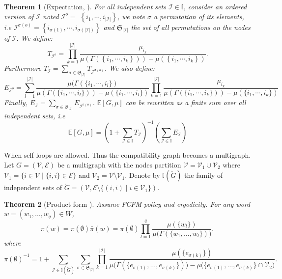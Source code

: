 \documentclass[11pt]{article}
\newtheorem{theorem}{Theorem}
\begin{document}
\begin{theorem}[Expectation, \cite{CDFB21}]\label{thm:EV-simple}
For all independent sets $\mathcal{I} \in \mathbb{I}$, consider an ordered version of $\mathcal{I}$ noted $\mathcal{I}^o=$ $\left\{i_1, \cdots, i_{|\mathcal{I}|}\right\}$, we note $\sigma$ a permutation of its elements, i.e $\mathcal{I}^{\sigma(o)}=\left\{i_{\sigma(1)}, \cdots, i_{\sigma(|\mathcal{I}|)}\right\}$ and $\mathfrak{S}_{|\mathcal{I}|}$ the set of all permutations on the nodes of $\mathcal{I}$. We define:
\[
T_{\mathcal{I}^o}=\prod_{k=1}^{|\mathcal{I}|} 
\frac{\mu_{i_k}}
{ \mu(\Gamma (\left\{i_1, \cdots, i_k\right\}))
	-\mu(\left\{i_1, \cdots, i_k\right\})}.
\]
Furthermore $T_{\mathcal{I}}=\sum_{\sigma \in \mathfrak{S}_{|\mathcal{I}|}} T_{\mathcal{I}^{\sigma(o)}}$.
We also define: 
\[
E_{\mathcal{I}^o}=\sum_{l=1}^{|\mathcal{I}|} 
\frac{\mu(\Gamma(\{i_1, \cdots, i_l\})}{ \mu(\Gamma( \{ i_1, \cdots, i_l \})) -\mu(\{i_1, \cdots, i_l\})} \prod_{k=1}^{|\mathcal{I}|} \frac{\mu_{i_k}}
{ \mu(\Gamma( \{ i_1, \cdots, i_k \})) -\mu(\{i_1, \cdots, i_k\})}
\]
Finally,  $E_{\mathcal{I}}=\sum_{\sigma \in \mathfrak{G}_{|\mathcal{I}|}} E_{\mathcal{I}^{\sigma(o)}}$. 
$\mathbb{E}[G, \mu ]$  can be rewritten as a finite sum over all independent sets, i.e 
\begin{equation}\label{eq:EV-simple}
	\mathbb{E}[G,\mu]=\left(1+\sum_{\mathcal{I} \in \mathbb{I}}T_{\mathcal{I}}\right)^{-1}\left(\sum_{\mathcal{I}\in \mathbb{I}} E_{\mathcal{I}}\right)
\end{equation}  
\end{theorem}

When self loops are allowed. Thus the compatibility graph becomes a multigraph. Let $G=(\mathcal{V}, \mathcal{E})$ be a multigraph with the nodes partition $\mathcal{V}=\mathcal{V}_1\cup\mathcal{V}_2$ where $\mathcal{V}_1=\{i\in \mathcal{V}\mid \{i,i\}\in \mathcal{E}\}$ and $\mathcal{V}_2 = \mathcal{V}\setminus \mathcal{V}_1$. Denote by $\mathbb{I} (\check{G})$ the family of independent sets of 
$\check{G}=(\mathcal{V},\mathcal{E}\setminus\{(i,i)\mid i\in\mathcal{V}_1\})$.

\begin{theorem}[Product form {\cite[Theorem 4.5]{BMMR20}}]\label{th:prod-multi}
	Assume FCFM policy and ergodicity.  
	For any word $w=(w_1,\dots,w_q)\in W$,
	\begin{equation}
		\pi(w)= \pi({\emptyset}) \bar{\pi}(w)  =  \pi({\emptyset}) \prod_{l=1}^{q}\frac{\mu(\{w_l\})}{\mu\bigl(\Gamma(\{w_1,\dots,w_l\})\bigr)},
	\end{equation}
	where
	\[
	\pi({\emptyset})^{-1}=1+\sum_{\mathcal{I}\in\mathbb{I}(\check{G})}\sum_{\sigma\in \mathfrak{S}_{|\mathcal{I}|}}
	\prod_{k=1}^{|\mathcal{I}|}
	\frac{\mu(\{e_{\sigma(k)}\})}{
		\mu\bigl(\Gamma(\{e_{\sigma(1)},\dots,e_{\sigma(k)}\})\bigr)-\mu\bigl(\{e_{\sigma(1)},\dots,e_{\sigma(k)}\}\cap \mathcal{V}_2\bigr)}. \]
\end{theorem} 
\end{document}
